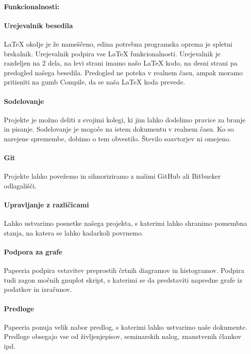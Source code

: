 \documentclass[a4paper, 12pt]{book}
\begin{document}
\newpage
\paragraph{Funkcionalnosti:\\}

\paragraph{Urejevalnik besedila}
{\LaTeX} okolje je že nameščeno, edina potrebna programska oprema je spletni brskalnik. Urejevalnik podpira vse {\LaTeX} funkcionalnosti. Urejevalnik je razdeljen na 2 dela, na levi strani imamo našo {\LaTeX} kodo, na desni strani pa predogled našega besedila. Predogled ne poteka v realnem času, ampak moramo pritisniti na gumb Compile, da se naša {\LaTeX} koda prevede.

\paragraph{Sodelovanje}
Projekte je možno deliti z svojimi kolegi, ki jim lahko dodelimo pravice za branje in pisanje. Sodelovanje je mogoče na istem dokumentu v realnem času. Ko so narejene spremembe, dobimo o tem obvestilo. Število soavtorjev ni omejeno.

\paragraph{Git}
Projekte lahko povežemo in sihnoriziramo z našimi GitHub ali Bitbucker odlagališči.

\paragraph{Upravljanje z različicami}
Lahko ustvarimo posnetke našega projekta, s katerimi lahko shranimo pomembna stanja, na katera se lahko kadarkoli povrnemo.

\paragraph{Podpora za grafe}
Papeeria podpira vstavitev preprostih črtnih diagramov in histogramov. Podpira tudi zagon močnih gnuplot skript, s katerimi se da predstaviti napredne grafe iz podatkov in izračunov.

\paragraph{Predloge}
Papeeria ponuja velik nabor predlog, s katerimi lahko ustvarimo naše dokumente. Predloge obsegajo vse od življenjepisov, seminarskih nalog, znanstvenih člankov ipd.
\end{document}
